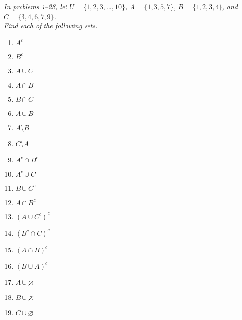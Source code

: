 \emph{In problems 1--28, let $U=\{1,2,3,\ldots,10\}$, $A=\{1,3,5,7\}$, $B=\{1,2,3,4\}$, and $C=\{3,4,6,7,9\}$.\\ Find each of the following sets.}

\begin{enumerate}
\item $A^c$ 

\item $B^c$ 

\item $A \cup C$ 

\item $A \cap B$ 

\item $B \cap C$ 

\item $A \cup B$ 

\item $A \setminus B$ 

\item $C \setminus A$ 

\item $A^c \cap B^c$ 

\item $A^c \cup C$ 

\item $B \cup C^c$ 

\item $A \cap B^c$ 

\item $(A \cup C^c)^c$ 

\item $(B^c \cap C)^c$ 

\item $(A \cap B)^c$ 

\item $(B \cup A)^c$ 

\item $A \cup \varnothing$ 

\item $B \cup \varnothing$ 

\item $C \cup \varnothing$ 


\end{enumerate}
